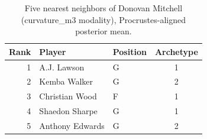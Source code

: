 \begin{table}[htbp]
  \centering\small
  \begin{tabular}{rllc}
    \toprule
    Rank & Player & Position & Archetype \\
    \midrule
    1 & A.J. Lawson & G & 1 \\
    2 & Kemba Walker & G & 2 \\
    3 & Christian Wood & F & 1 \\
    4 & Shaedon Sharpe & G & 1 \\
    5 & Anthony Edwards & G & 2 \\
    \bottomrule
  \end{tabular}
  \caption{Five nearest neighbors of Donovan Mitchell (curvature_m3 modality), Procrustes-aligned posterior mean.}
  \label{tab:Donovan_Mitchell_neighbors_curvature_m3}
\end{table}

